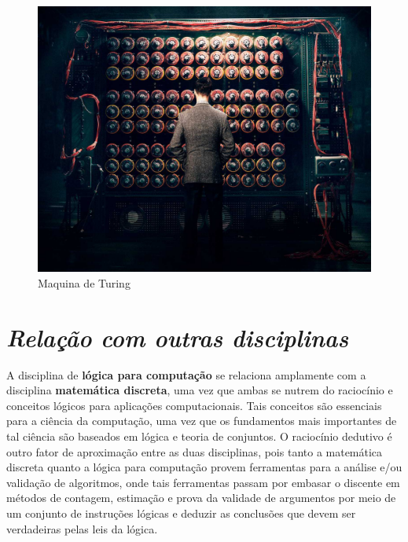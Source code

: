 \documentclass{article}
\begin{document}
\paragraph{}
\begin{figure}[h!]
    \centering
    \includegraphics[scale=0.13]{turing.jpg}
    \caption{Maquina de Turing\cite{imgTuring}}
    \label{fig:my_label}
\end{figure}

\section{\emph{Relação com outras disciplinas}}
A disciplina de \textbf{lógica para computação} se relaciona amplamente com a disciplina \textbf{matemática discreta}, uma vez que ambas se nutrem do raciocínio e conceitos lógicos para aplicações computacionais. Tais conceitos são essenciais para a ciência da computação, uma vez que os fundamentos mais importantes de tal ciência são baseados em lógica e teoria de conjuntos. O raciocínio dedutivo é outro fator de aproximação entre as duas disciplinas, pois tanto a matemática discreta quanto a lógica para computação provem ferramentas para a análise e/ou validação de algoritmos, onde tais ferramentas passam por embasar o discente em métodos de contagem, estimação e prova da validade de argumentos por meio de um conjunto de instruções lógicas e deduzir as conclusões que devem ser verdadeiras pelas leis da lógica.\cite{logicaWiki} 




\end{document}
